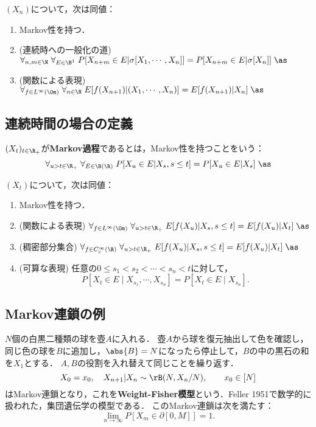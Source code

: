 \documentclass[uplatex,dvipdfmx]{jsreport}
\begin{document}
\begin{theorem}[Markov性の特徴付け]
    $(X_n)$について，次は同値：
    \begin{enumerate}
        \item Markov性を持つ．
        \item (連続時への一般化の道) $\forall_{n,m\in\N}\;\forall_{E\in\B^1}\;P[X_{n+m}\in E|\sigma[X_1,\cdots,X_n]]=P[X_{n+m}\in E|\sigma[X_n]]\;\as$
        \item (関数による表現) $\forall_{f\in L^\infty(\Om)}\;\forall_{n\in\N}\;E[f(X_{n+1})|(X_1,\cdots,X_n)]=E[f(X_{n+1})|X_n]\;\as$
    \end{enumerate}
\end{theorem}

\subsection{連続時間の場合の定義}

\begin{definition}\label{def-Markov-process}
    $(X_t)_{t\in\R_+}$が\textbf{Markov過程}であるとは，Markov性を持つことをいう：
    \[\forall_{u>t\in\R_+}\;\forall_{E\in\B(\R)}\;P[X_u\in E|X_s,s\le t]=P[X_u\in E|X_s]\;\as\]
\end{definition}

\begin{theorem}[Markov性の特徴付け]
    $(X_t)$について，次は同値：
    \begin{enumerate}
        \item Markov性を持つ．
        \item (関数による表現) $\forall_{f\in L^\infty(\Om)}\;\forall_{u>t\in\R_+}\;E[f(X_{u})|X_s,s\le t]=E[f(X_{u})|X_t]\;\as$
        \item (稠密部分集合) $\forall_{f\in C_c^\infty(\R)}\;\forall_{u>t\in\R_+}\;E[f(X_{u})|X_s,s\le t]=E[f(X_{u})|X_t]\;\as$
        \item (可算な表現) 任意の$0\le s_1<s_2<\cdots<s_n<t$に対して，
        \[P[X_t\in E\mid X_{s_1},\cdots,X_{s_n}]=P[X_t\in E\mid X_{s_n}].\]
    \end{enumerate}
\end{theorem}

\subsection{Markov連鎖の例}

\begin{example}
    $N$個の白黒二種類の球を壺$A$に入れる．
    壺$A$から球を復元抽出して色を確認し，同じ色の球を$B$に追加し，$\abs{B}=N$になったら停止して，$B$の中の黒石の和を$X_1$とする．
    $A,B$の役割を入れ替えて同じことを繰り返す．
    \[X_0=x_0,\quad X_{n+1}|X_n\sim \rB(N,X_n/N),\qquad x_0\in[N]\]
    はMarkov連鎖となり，これを\textbf{Weight-Fisher模型}という．Feller 1951で数学的に扱われた，集団遺伝学の模型である．
    このMarkov連鎖は次を満たす：
    \[\lim_{n\to\infty}P[X_m\in\partial[0,M]]=1.\]
\end{example}
\end{document}
